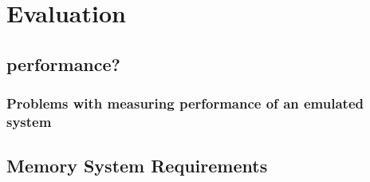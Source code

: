 \chapter{Evaluation}

\label{chap:eval}

\section{performance?}
\subsection{Problems with measuring performance of an emulated system}

\section{Memory System Requirements}
\cite{jacobSoftwaremanagedAddressTranslation1997}
